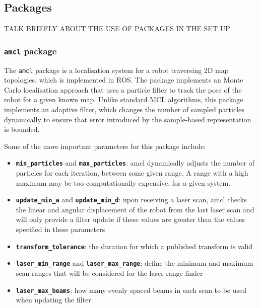 \documentclass[a4paper]{article}
\begin{document}
\subsection{Packages}
TALK BRIEFLY ABOUT THE USE OF PACKAGES IN THE SET UP
\subsubsection{\texttt{amcl} package}
The \texttt{amcl} package is a localisation system for a robot traversing 2D map topologies, which is implemented in ROS. The package implements an Monte Carlo localisation approach that uses a particle filter to track the pose of the robot for a given known map. Unlike standard MCL algorithms, this package implements an adaptive filter, which changes the number of sampled particles dynamically to ensure that error introduced by the sample-based representation is bounded.

Some of the more important parameters for this package include:
\begin{itemize}
\item \textbf{\texttt{min\_particles}} and \textbf{\texttt{max\_particles}}: amcl dynamically adjusts the number of particles for each iteration, between some given range. A range with a high maximum may be too computationally expensive, for a given system.
\item \textbf{\texttt{update\_min\_a}} and \textbf{\texttt{update\_min\_d}}: upon receiving a laser scan, amcl checks the linear and angular displacement of the robot from the last laser scan and will only provide a filter update if these values are greater than the values specified in these parameters 
\item \textbf{\texttt{transform\_tolerance}}: the duration for which a published transform is valid
\item \textbf{\texttt{laser\_min\_range}} and \textbf{\texttt{laser\_max\_range}}: define the minimum and maximum scan ranges that will be considered for the laser range finder 
\item \textbf{\texttt{laser\_max\_beams}}: how many evenly spaced beams in each scan to be used when updating the filter
\end{itemize}
\end{document}
